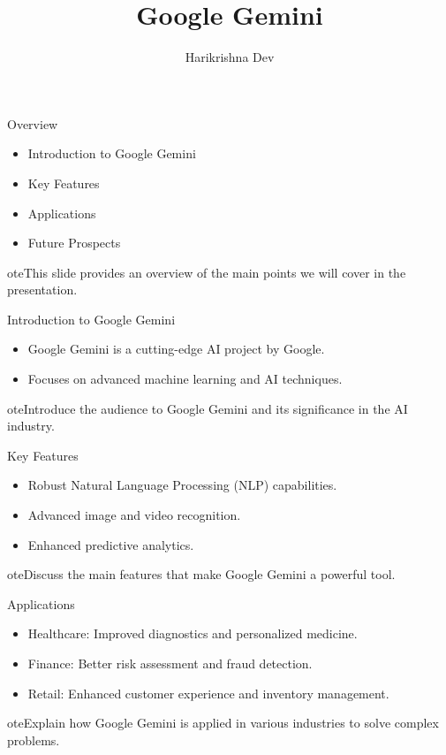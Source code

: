 \documentclass{beamer}
\title{Google Gemini}
\author{Harikrishna Dev}
\institute{University of Texas at Dallas}
\begin{document}
\begin{frame}
  \titlepage
\end{frame}

\begin{frame}{Overview}
  \begin{itemize}
    \item Introduction to Google Gemini
    \item Key Features
    \item Applications
    \item Future Prospects
  \end{itemize}
  
ote{This slide provides an overview of the main points we will cover in the presentation.}
\end{frame}

\begin{frame}{Introduction to Google Gemini}
  \begin{itemize}
    \item Google Gemini is a cutting-edge AI project by Google.
    \item Focuses on advanced machine learning and AI techniques.
  \end{itemize}
  
ote{Introduce the audience to Google Gemini and its significance in the AI industry.}
\end{frame}

\begin{frame}{Key Features}
  \begin{itemize}
    \item Robust Natural Language Processing (NLP) capabilities.
    \item Advanced image and video recognition.
    \item Enhanced predictive analytics.
  \end{itemize}
  
ote{Discuss the main features that make Google Gemini a powerful tool.}
\end{frame}

\begin{frame}{Applications}
  \begin{itemize}
    \item Healthcare: Improved diagnostics and personalized medicine.
    \item Finance: Better risk assessment and fraud detection.
    \item Retail: Enhanced customer experience and inventory management.
  \end{itemize}
  
ote{Explain how Google Gemini is applied in various industries to solve complex problems.}
\end{frame}
\end{document}
